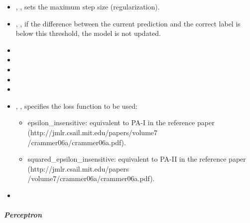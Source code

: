 \begin{itemize}
  \item {}, , sets the maximum step size
  (regularization).
  \item {}, , if the difference between the
  current prediction and the correct label is below this threshold, the model is
  not updated.
  \item {}
  \item {}
  \item {}
  \item {}
  \item {}
  \item {}, , specifies the loss
  function to be used:
  \begin{itemize}
    \item epsilon\_insensitive: equivalent to PA-I in the reference paper (http://jmlr.csail.mit.edu/papers/volume7
    /crammer06a/crammer06a.pdf).
    \item squared\_epsilon\_insensitive: equivalent to PA-II in the reference paper (http://jmlr.csail.mit.edu/papers
    /volume7/crammer06a/crammer06a.pdf).
  \end{itemize}
  \item {}
\end{itemize}
\subparagraph{Perceptron}
\mbox{}

